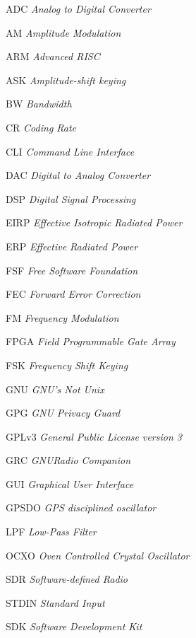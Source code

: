 \documentclass[
  12pt,				%
  openright,			%
  twoside,			%
  a4paper,			%
  english,			%
  french,				%
  spanish,			%
  brazil,				%
  ]{abntex2}
\begin{document}
\begin{siglas}

  \item[ADC]         \textit{Analog to Digital Converter}
  \item[AM]         \textit{Amplitude Modulation}
  \item[ARM]        \textit{Advanced RISC}
  \item[ASK]        \textit{Amplitude-shift keying}
  \item[BW]         \textit{Bandwidth}
  \item[CR]         \textit{Coding Rate}
  \item[CLI]        \textit{Command Line Interface}
  \item[DAC]        \textit{Digital to Analog Converter}
  \item[DSP]        \textit{Digital Signal Processing}
  \item[EIRP]       \textit{Effective Isotropic Radiated Power}
  \item[ERP]        \textit{Effective Radiated Power}
  \item[FSF]        \textit{Free Software Foundation}
  \item[FEC]        \textit{Forward Error Correction}
  \item[FM]         \textit{Frequency Modulation}
  \item[FPGA]       \textit{Field Programmable Gate Array}
  \item[FSK]        \textit{Frequency Shift Keying}
  \item[GNU]        \textit{GNU's Not Unix}
  \item[GPG]        \textit{GNU Privacy Guard}
  \item[GPLv3]      \textit{General Public License version 3}
  \item[GRC]        \textit{GNURadio Companion}
  \item[GUI]        \textit{Graphical User Interface}
  \item[GPSDO]      \textit{GPS disciplined oscillator}
  \item[LPF]         \textit{Low-Pass Filter}
  \item[OCXO]       \textit{Oven Controlled Crystal Oscillator}
  \item[SDR]        \textit{Software-defined Radio}
  \item[STDIN]      \textit{Standard Input}
  \item[SDK]        \textit{Software Development Kit}

\end{siglas}
\end{document}
